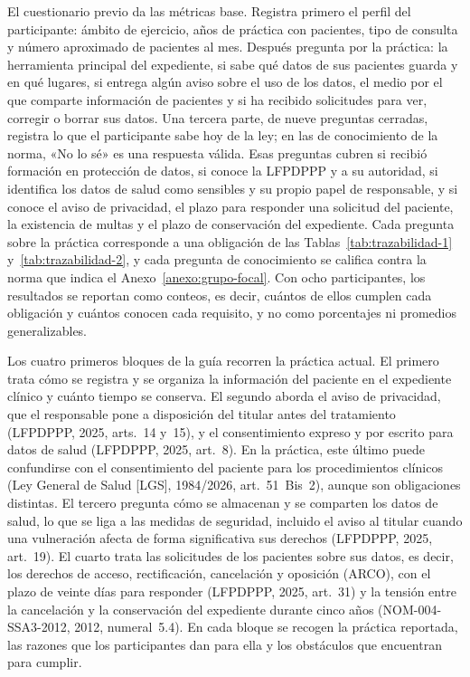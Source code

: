 \documentclass[12pt, a4paper]{article}
\begin{document}
El cuestionario previo da las métricas base. Registra primero el perfil
del participante: ámbito de ejercicio, años de práctica con pacientes,
tipo de consulta y número aproximado de pacientes al mes. Después
pregunta por la práctica: la herramienta principal del expediente, si
sabe qué datos de sus pacientes guarda y en qué lugares, si entrega
algún aviso sobre el uso de los datos, el medio por el que comparte
información de pacientes y si ha recibido solicitudes para ver, corregir
o borrar sus datos. Una tercera parte, de nueve preguntas cerradas,
registra lo que el participante sabe hoy de la ley; en las de
conocimiento de la norma, «No lo sé» es una respuesta válida. Esas
preguntas cubren si recibió formación en protección de datos, si conoce
la LFPDPPP y a su autoridad, si identifica los datos de salud como
sensibles y su propio papel de responsable, y si conoce el aviso de
privacidad, el plazo para responder una solicitud del paciente, la
existencia de multas y el plazo de conservación del expediente. Cada
pregunta sobre la práctica corresponde a una obligación de las
Tablas~\ref{tab:trazabilidad-1} y~\ref{tab:trazabilidad-2}, y cada
pregunta de conocimiento se califica contra la norma que indica el
Anexo~\ref{anexo:grupo-focal}. Con ocho participantes, los resultados se
reportan como conteos, es decir, cuántos de ellos cumplen cada
obligación y cuántos conocen cada requisito, y no como porcentajes ni
promedios generalizables.

Los cuatro primeros bloques de la guía recorren la práctica actual. El
primero trata cómo se registra y se organiza la información del paciente
en el expediente clínico y cuánto tiempo se conserva. El segundo aborda
el aviso de privacidad, que el responsable pone a disposición del
titular antes del tratamiento (LFPDPPP, 2025, arts.~14 y~15), y el
consentimiento expreso y por escrito para datos de salud (LFPDPPP, 2025,
art.~8). En la práctica, este último puede confundirse con el
consentimiento del paciente para los procedimientos clínicos (Ley
General de Salud [LGS], 1984/2026, art.~51~Bis~2), aunque son
obligaciones distintas. El tercero pregunta cómo se almacenan y se
comparten los datos de salud, lo que se liga a las medidas de seguridad,
incluido el aviso al titular cuando una vulneración afecta de forma
significativa sus derechos (LFPDPPP, 2025, art.~19). El cuarto trata las
solicitudes de los pacientes sobre sus datos, es decir, los derechos de
acceso, rectificación, cancelación y oposición (ARCO), con el plazo de
veinte días para responder (LFPDPPP, 2025, art.~31) y la tensión entre
la cancelación y la conservación del expediente durante cinco años
(NOM-004-SSA3-2012, 2012, numeral~5.4). En cada bloque se recogen la
práctica reportada, las razones que los participantes dan para ella y
los obstáculos que encuentran para cumplir.
 
\end{document}
